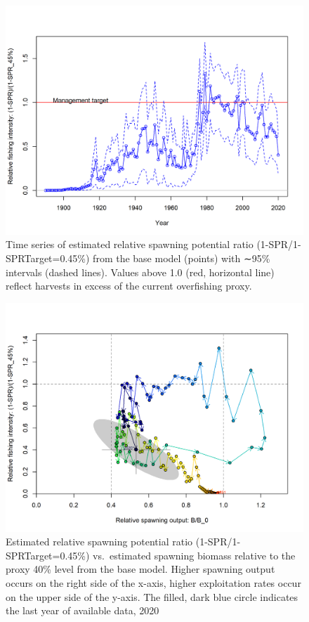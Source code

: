 \documentclass[11pt,
  english,
  a4paper,
]{article}
\begin{document}
\begin{figure}
\centering
\includegraphics[width=1\textwidth,height=1\textheight]{figs/SPR3_ratiointerval.png}
\caption{Time series of estimated relative spawning potential ratio (1-SPR/1-SPRTarget=0.45\%) from the base model (points) with ∼95\% intervals (dashed lines). Values above 1.0 (red, horizontal line) reflect harvests in excess of the current overfishing proxy.\label{fig:relSPR3}}
\end{figure}

\tagmcend\tagstructend


\begin{figure}
\centering
\includegraphics[width=1\textwidth,height=1\textheight]{figs/SPR4_phase.png}
\caption{Estimated relative spawning potential ratio (1-SPR/1-SPRTarget=0.45\%) vs.~estimated spawning biomass relative to the proxy 40\% level from the base model. Higher spawning output occurs on the right side of the x-axis, higher exploitation rates occur on the upper side of the y-axis. The filled, dark blue circle indicates the last year of available data, 2020\label{fig:relSPR2}}
\end{figure}
\end{document}
